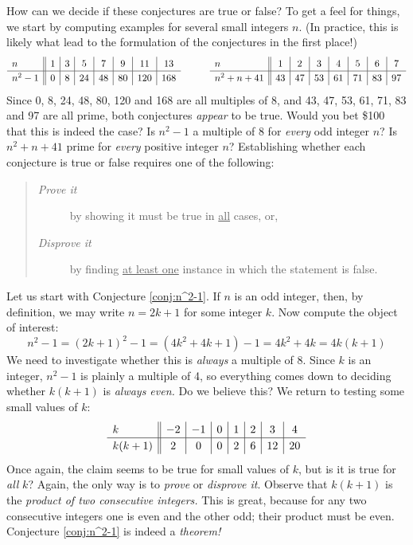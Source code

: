 How can we decide if these conjectures are true or false? To get a feel for things, we start by computing examples for several small integers $n$. (In practice, this is likely what lead to the formulation of the conjectures in the first place!)
\[
	\def\arraystretch{1.2}
	\begin{array}{l||c|c|c|c|c|c|c}
		n & 1 & 3 & 5 & 7 & 9 & 11 & 13\\\hline
		n^2-1 & 0 & 8 & 24 & 48 & 80 & 120 & 168
	\end{array}
	\qquad\quad
	\begin{array}{l||c|c|c|c|c|c|c}
		n & 1 & 2 & 3 & 4 & 5 & 6 & 7\\\hline
		n^2+n+41 & 43 & 47 & 53 & 61 & 71 & 83 & 97
	\end{array}
\]
Since 0, 8, 24, 48, 80, 120 and 168 are all multiples of 8, and 43, 47, 53, 61, 71, 83 and 97 are all prime, both conjectures \emph{appear} to be true. Would you bet \$100 that this is indeed the case? Is $n^2-1$ a multiple of 8 for \emph{every} odd integer $n$? Is $n^2+n+41$ prime for \emph{every} positive integer $n$? Establishing whether each conjecture is true or false requires one of the following:

\begin{quote}
\begin{description}
  \item[\normalfont\emph{Prove it}] by showing it must be true in \underline{all} cases, or,
  \item[\normalfont\emph{Disprove it}] by finding \underline{at least one} instance in which the statement is false.
\end{description}
\end{quote}

Let us start with Conjecture \ref{conj:n^2-1}. If $n$ is an odd integer, then, by definition, we may write $n=2k+1$ for some integer $k$. Now compute the object of interest:
\[
	n^2-1 =(2k+1)^2-1 =(4k^2+4k+1)-1 =4k^2+4k =4k(k+1)
\]
We need to investigate whether this is \emph{always} a multiple of 8. Since $k$ is an integer, $n^2-1$ is plainly a multiple of 4, so everything comes down to deciding whether $k(k+1)$ is \emph{always even.} Do we believe this? We return to testing some small values of $k$:
\[
	\def\arraystretch{1.2}
	\begin{array}{l||c|c|c|c|c|c|c}
		k & -2 & -1 & 0 & 1 & 2 & 3 & 4\\\hline
		k(k+1) & 2 & 0 & 0 & 2 & 6 & 12 & 20
	\end{array}
\]
Once again, the claim seems to be true for small values of $k$, but is it is true for \emph{all} $k$? Again, the only way is to \emph{prove} or \emph{disprove it}. Observe that $k(k+1)$ is the \emph{product of two consecutive integers.} This is great, because for any two consecutive integers one is even and the other odd; their product must be even. Conjecture \ref{conj:n^2-1} is indeed a \emph{theorem!}\smallbreak

